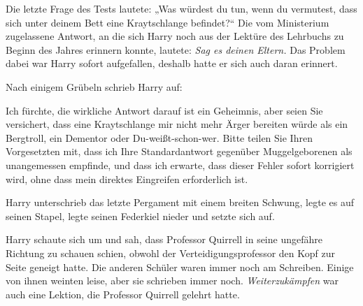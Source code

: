 Die letzte Frage des Tests lautete:
„Was würdest du tun, wenn du vermutest, dass sich unter deinem Bett eine Kraytschlange befindet?“ Die vom Ministerium zugelassene Antwort, an die sich Harry noch aus der Lektüre des Lehrbuchs zu Beginn des Jahres erinnern konnte, lautete: \emph{Sag es deinen Eltern.}
Das Problem dabei war Harry sofort aufgefallen, deshalb hatte er sich auch daran erinnert.

Nach einigem Grübeln schrieb Harry auf:

\begin{writtenNote}
Ich fürchte, die wirkliche Antwort darauf ist ein Geheimnis, aber seien Sie versichert, dass eine Kraytschlange mir nicht mehr Ärger bereiten würde als ein Bergtroll, ein Dementor oder Du-weißt-schon-wer. Bitte teilen Sie Ihren Vorgesetzten mit, dass ich Ihre Standardantwort gegenüber Muggelgeborenen als unangemessen empfinde, und dass ich erwarte, dass dieser Fehler sofort korrigiert wird, ohne dass mein direktes Eingreifen erforderlich ist.
\end{writtenNote}

Harry unterschrieb das letzte Pergament mit einem breiten Schwung, legte es auf seinen Stapel, legte seinen Federkiel nieder und setzte sich auf.

Harry schaute sich um und sah, dass Professor Quirrell in seine ungefähre Richtung zu schauen schien, obwohl der Verteidigungsprofessor den Kopf zur Seite geneigt hatte. Die anderen Schüler waren immer noch am Schreiben. Einige von ihnen weinten leise, aber sie schrieben immer noch. \emph{Weiterzukämpfen} war auch eine Lektion, die Professor Quirrell gelehrt hatte.

